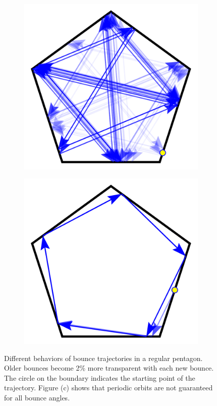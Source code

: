 \documentclass[letterpaper, 10 pt, conference]{ieeeconf}  %
\begin{document}
\begin{figure}[tp]
\begin{subfigure}{0.25\textwidth}
\includegraphics[width=0.8\linewidth]{figs/pent_165rad.pdf}
\end{subfigure}%
\begin{subfigure}{0.25\textwidth}
\includegraphics[width=0.8\linewidth]{figs/pent_3rad.pdf}
\end{subfigure}
\caption{Different behaviors of bounce trajectories in a regular pentagon.
Older bounces become 2\% more transparent with each new bounce. The circle on
the boundary indicates the starting point of the trajectory. Figure (c) shows
that periodic orbits are not guaranteed for all bounce angles.}
\end{figure}
\end{document}
